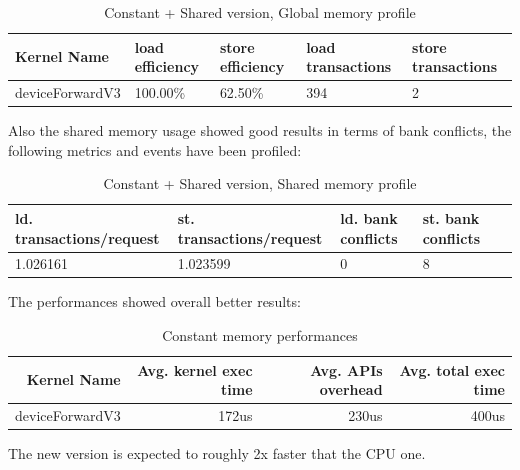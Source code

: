 \documentclass[a4paper]{report}
\begin{document}
\begin{table}[!h]
\centering
\begin{tabular}{|l|l|l|l|l|}
\hline
\textbf{Kernel Name} & \textbf{load efficiency} & \textbf{store efficiency} & \textbf{load transactions} & \textbf{store transactions} \\ \hline
deviceForwardV3           & 100.00\%           & 62.50\%           & 394           & 2       \\ \hline
\end{tabular}
\vspace*{3mm}
\caption{Constant + Shared version, Global memory profile}
\label{table:t5}
\end{table}

Also the shared memory usage showed good results in terms of bank conflicts, the following metrics and events have been profiled:

\begin{table}[!h]
\centering
\begin{tabular}{|l|l|l|l|l|}
\hline
\textbf{ld. transactions/request} & \textbf{st. transactions/request} & \textbf{ld. bank conflicts} & \textbf{st. bank conflicts}  \\ \hline
1.026161           & 1.023599           & 0           & 8          \\ \hline
\end{tabular}
\vspace*{3mm}
\caption{Constant + Shared version, Shared memory profile}
\label{table:t6}
\end{table}

The performances showed overall better results: 

\begin{table}[!h]
\centering
\begin{tabular}{|r|r|r|r|}
\hline
\textbf{Kernel Name} & \textbf{Avg. kernel exec time} & \textbf{Avg. APIs overhead} & \textbf{Avg. total exec time} \\ \hline
deviceForwardV3           & 172us          & 230us   & 400us\\ \hline
\end{tabular}
\vspace*{3mm}
\caption{Constant memory  performances}
\label{table:t7}
\end{table}

The new version is expected to roughly 2x faster that the CPU one.
\end{document}
